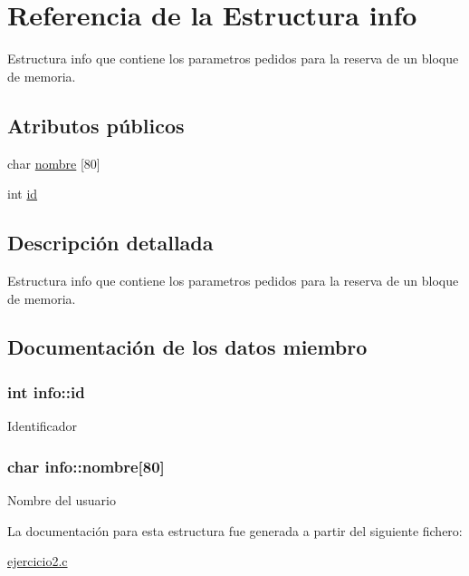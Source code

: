 \hypertarget{structinfo}{}\section{Referencia de la Estructura info}
\label{structinfo}


Estructura info que contiene los parametros pedidos para la reserva de un bloque de memoria.  


\subsection*{Atributos públicos}
\begin{DoxyCompactItemize}
\item 
char \hyperlink{structinfo_aaa02777b492865c2877852cb159803b1}{nombre} \mbox{[}80\mbox{]}
\item 
int \hyperlink{structinfo_afe86f23d8bd5fd8d139e39a5b1a01171}{id}
\end{DoxyCompactItemize}


\subsection{Descripción detallada}
Estructura info que contiene los parametros pedidos para la reserva de un bloque de memoria. 

\subsection{Documentación de los datos miembro}
\subsubsection[{\texorpdfstring{id}{id}}]{\setlength{\rightskip}{0pt plus 5cm}int info\+::id}\hypertarget{structinfo_afe86f23d8bd5fd8d139e39a5b1a01171}{}\label{structinfo_afe86f23d8bd5fd8d139e39a5b1a01171}
Identificador 
\subsubsection[{\texorpdfstring{nombre}{nombre}}]{\setlength{\rightskip}{0pt plus 5cm}char info\+::nombre\mbox{[}80\mbox{]}}\hypertarget{structinfo_aaa02777b492865c2877852cb159803b1}{}\label{structinfo_aaa02777b492865c2877852cb159803b1}
Nombre del usuario 

La documentación para esta estructura fue generada a partir del siguiente fichero\+:\begin{DoxyCompactItemize}
\item 
\hyperlink{ejercicio2_8c}{ejercicio2.\+c}\end{DoxyCompactItemize}
